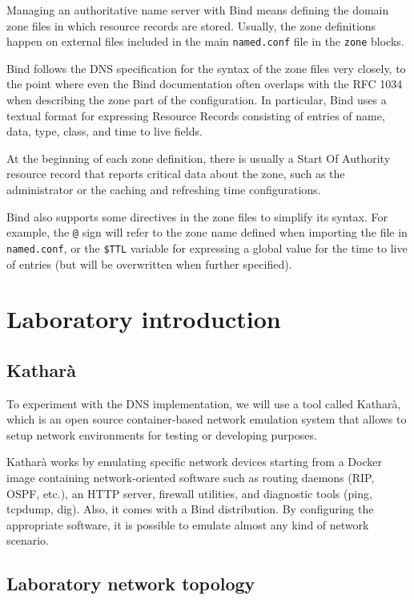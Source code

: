 \documentclass[11pt,a4paper]{article}
\begin{document}
Managing an authoritative name server with Bind means defining the domain zone files in
which resource records are stored. Usually, the zone definitions happen on external files included in the main \texttt{named.conf} file in the \texttt{zone} blocks.

\noindent
Bind follows the DNS specification for the syntax of the zone files very closely, to the point
where even the Bind documentation often overlaps with the RFC 1034 when describing the zone
part of the configuration. In particular, Bind uses a textual format for expressing Resource Records consisting of entries of name, data, type, class, and time to live fields.

\noindent
At the beginning of each zone definition, there is usually a Start Of Authority resource record
that reports critical data about the zone, such as the administrator or the caching and refreshing
time configurations.

\noindent
Bind also supports some directives in the zone files to simplify its syntax. For example, the \texttt{@} sign will refer to the zone name defined when importing the file in \texttt{named.conf}, or the \texttt{\$TTL} variable for expressing a global value for the time to live of entries (but will be overwritten when further specified).

\section{Laboratory introduction}

\subsection{Katharà}
To experiment with the DNS implementation, we will use a tool called Katharà, which is an open
source container-based network emulation system that allows to setup network environments
for testing or developing purposes.

\noindent
Katharà works by emulating specific network devices starting from a Docker image containing network-oriented software such as routing daemons (RIP, OSPF, etc.), an HTTP server, firewall
utilities, and diagnostic tools (ping, tcpdump, dig). Also, it comes with a Bind distribution.
By configuring the appropriate software, it is possible to emulate almost any kind of network
scenario.

\subsection{Laboratory network topology}
\end{document}
